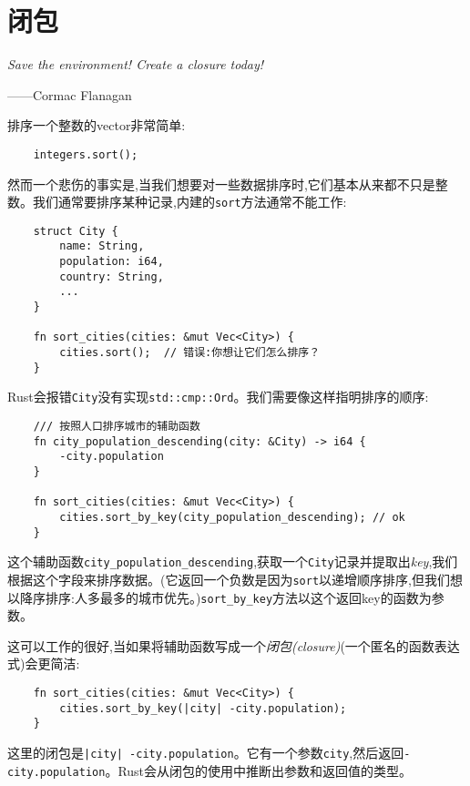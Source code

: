 \chapter{闭包}\label{ch14}

\emph{Save the environment! Create a closure today!}

\begin{flushright}
    ——Cormac Flanagan
\end{flushright}

排序一个整数的vector非常简单:
\begin{verbatim}
    integers.sort();
\end{verbatim}

然而一个悲伤的事实是,当我们想要对一些数据排序时,它们基本从来都不只是整数。我们通常要排序某种记录,内建的\texttt{sort}方法通常不能工作:
\begin{verbatim}
    struct City {
        name: String,
        population: i64,
        country: String,
        ...
    }

    fn sort_cities(cities: &mut Vec<City>) {
        cities.sort();  // 错误:你想让它们怎么排序？
    }
\end{verbatim}

Rust会报错\texttt{City}没有实现\texttt{std::cmp::Ord}。我们需要像这样指明排序的顺序:
\begin{verbatim}
    /// 按照人口排序城市的辅助函数
    fn city_population_descending(city: &City) -> i64 {
        -city.population
    }

    fn sort_cities(cities: &mut Vec<City>) {
        cities.sort_by_key(city_population_descending); // ok
    }
\end{verbatim}

这个辅助函数\texttt{city\_population\_descending},获取一个\texttt{City}记录并提取出\emph{key},我们根据这个字段来排序数据。(它返回一个负数是因为\texttt{sort}以递增顺序排序,但我们想以降序排序:人多最多的城市优先。)\texttt{sort\_by\_key}方法以这个返回key的函数为参数。

这可以工作的很好,当如果将辅助函数写成一个\emph{闭包(closure)}(一个匿名的函数表达式)会更简洁:
\begin{verbatim}
    fn sort_cities(cities: &mut Vec<City>) {
        cities.sort_by_key(|city| -city.population);
    }
\end{verbatim}

这里的闭包是\texttt{|city| -city.population}。它有一个参数\texttt{city},然后返回\texttt{-city.population}。Rust会从闭包的使用中推断出参数和返回值的类型。


